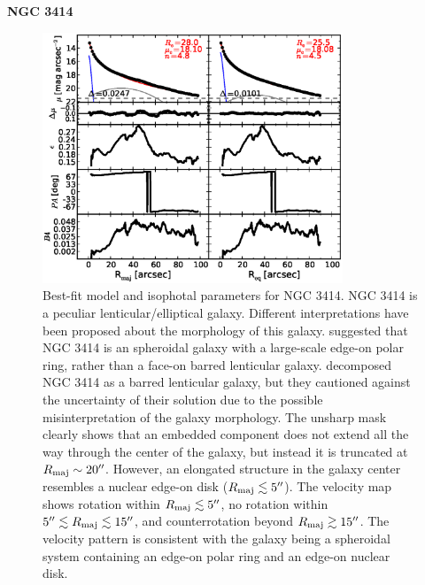 \documentclass[preprint2]{emulateapj}
\newcommand{\fitfigurewidth}{0.8\textwidth}
\begin{document}
  \clearpage\newpage\noindent
  {\bf NGC 3414 \\}

  \begin{figure}[h]
  \begin{center}
  \includegraphics[width=\fitfigurewidth]{images/n3414_1Dfit.eps}
  \caption{Best-fit model and isophotal parameters for NGC 3414.
  NGC 3414 is a peculiar lenticular/elliptical galaxy. 
  Different interpretations have been proposed about the morphology of this galaxy.
  \cite{whitmore1990} suggested that NGC 3414 is an spheroidal galaxy 
  with a large-scale edge-on polar ring, rather than a face-on barred lenticular galaxy.
  \cite{laurikainen2010} decomposed NGC 3414 as a barred lenticular galaxy, but 
  they cautioned against the uncertainty of their solution due to the possible misinterpretation of the galaxy morphology.
  The unsharp mask clearly shows that an embedded component does not extend all the way through the 
  center of the galaxy, but instead it is truncated at $R_{\rm maj} \sim 20''$.
  However, an elongated structure in the galaxy center resembles a nuclear edge-on disk ($R_{\rm maj} \lesssim 5''$).
  The velocity map shows rotation within $R_{\rm maj} \lesssim 5''$, no rotation within $5'' \lesssim R_{\rm maj} \lesssim 15''$,
  and counterrotation beyond $R_{\rm maj} \gtrsim 15''$.
  The velocity pattern is consistent with the galaxy being a spheroidal system containing an edge-on polar ring and an edge-on nuclear disk.
  }
  \end{center}
  \end{figure}
\end{document}

